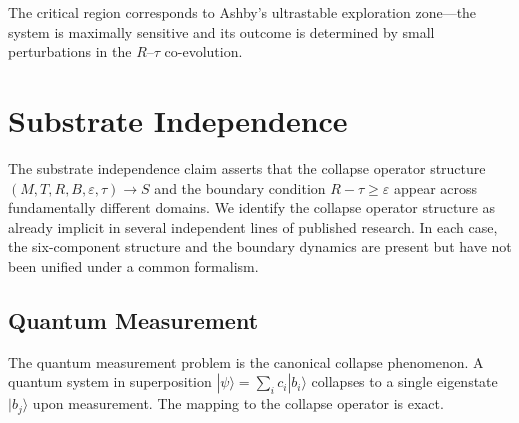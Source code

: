 \documentclass[11pt]{article}
\theoremstyle{plain}
\begin{document}
The critical region corresponds to Ashby's ultrastable exploration zone---the system is maximally
sensitive and its outcome is determined by small perturbations in the $R$--$\tau$ co-evolution.

\section{Substrate Independence}\label{sec:substrate}

The substrate independence claim asserts that the collapse operator structure
$(M, T, R, B, \varepsilon, \tau) \to S$ and the boundary condition $R - \tau \geq \varepsilon$
appear across fundamentally different domains. We identify the collapse operator structure as
already implicit in several independent lines of published research. In each case, the
six-component structure and the boundary dynamics are present but have not been unified under a
common formalism.

\subsection{Quantum Measurement}\label{sec:quantum}

The quantum measurement problem is the canonical collapse phenomenon. A quantum system in
superposition $|\psi\rangle = \sum_i c_i |b_i\rangle$ collapses to a single eigenstate
$|b_j\rangle$ upon measurement. The mapping to the collapse operator is exact.
\end{document}
